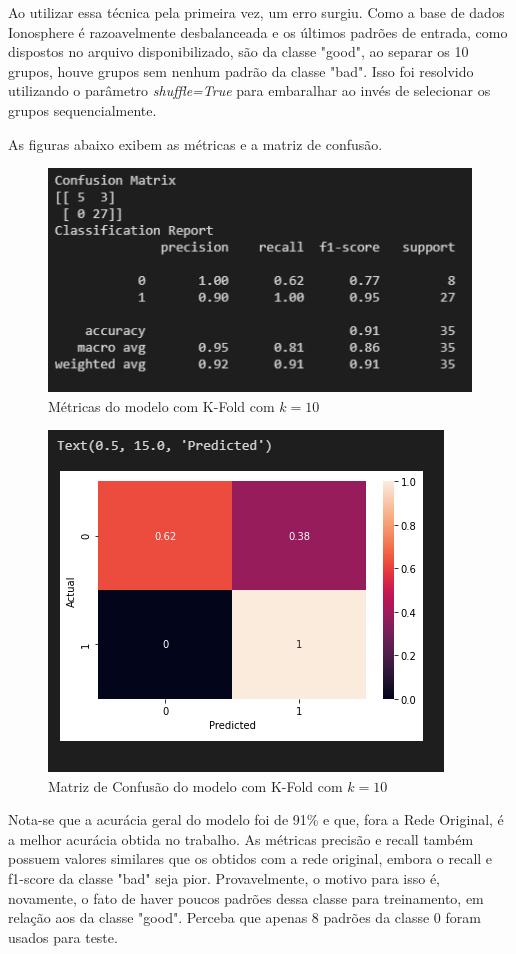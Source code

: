 \documentclass[12pt]{article}
\begin{document}
Ao utilizar essa técnica pela primeira vez, um erro surgiu. Como a base de dados Ionosphere é razoavelmente desbalanceada e os últimos padrões de entrada, como dispostos no arquivo disponibilizado, são da classe "good", ao separar os 10 grupos, houve grupos sem nenhum padrão da classe "bad". Isso foi resolvido utilizando o parâmetro \textit{shuffle=True} para embaralhar ao invés de selecionar os grupos sequencialmente.

As figuras abaixo exibem as métricas e a matriz de confusão.

\begin{figure}[H]
	\centering
	\includegraphics[width=0.7\linewidth]{Imagens/metricasconfusao}
	\caption{Métricas do modelo com K-Fold com $k=10$}
	\label{fig:metricasconfusao}
\end{figure}
\begin{figure}[H]
	\centering
	\includegraphics[width=0.7\linewidth]{Imagens/kfoldconfusao}
	\caption{Matriz de Confusão do modelo com K-Fold com $k=10$}
	\label{fig:kfoldconfusao}
\end{figure}

Nota-se que a acurácia geral do modelo foi de 91\% e que, fora a Rede Original, é a melhor acurácia obtida no trabalho. As métricas precisão e recall também possuem valores similares que os obtidos com a rede original, embora o recall e f1-score da classe "bad" seja pior. Provavelmente, o motivo para isso é, novamente, o fato de haver poucos padrões dessa classe para treinamento, em relação aos da classe "good". Perceba que apenas 8 padrões da classe 0 foram usados para teste.
\end{document}
